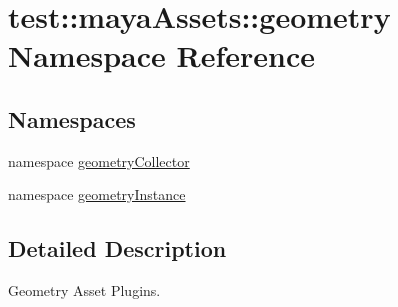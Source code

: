 \hypertarget{namespacetest_1_1mayaAssets_1_1geometry}{\section{test\-:\-:maya\-Assets\-:\-:geometry \-Namespace \-Reference}
\label{d3/d97/namespacetest_1_1mayaAssets_1_1geometry}
}
\subsection*{\-Namespaces}
\begin{DoxyCompactItemize}
\item 
namespace \hyperlink{namespacetest_1_1mayaAssets_1_1geometry_1_1geometryCollector}{geometry\-Collector}
\item 
namespace \hyperlink{namespacetest_1_1mayaAssets_1_1geometry_1_1geometryInstance}{geometry\-Instance}
\end{DoxyCompactItemize}


\subsection{\-Detailed \-Description}
\begin{DoxyVerb}
Geometry Asset Plugins.
\end{DoxyVerb}
 